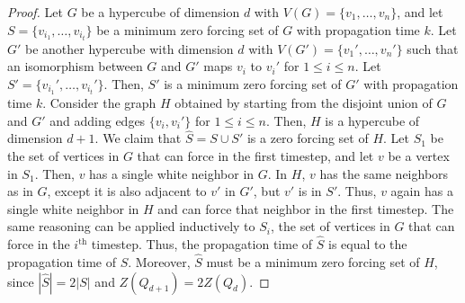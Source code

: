 \documentclass[twoside, 12pt]{article}
\theoremstyle{definition}
\begin{document}
\begin{proof}
Let $G$ be a hypercube of dimension $d$ with $V(G)=\{v_1,\ldots,v_n\}$, and let $S=\{v_{i_1},\ldots,v_{i_t}\}$ be a minimum zero forcing set of $G$ with propagation time $k$. Let $G'$ be another hypercube with dimension $d$ with $V(G')=\{v_1',\ldots,v_n'\}$ such that an isomorphism between $G$ and $G'$ maps $v_i$ to $v_i'$ for $1\leq i\leq n$. Let $S'=\{v_{i_1}',\ldots,v_{i_t}'\}$. Then, $S'$ is a minimum zero forcing set of $G'$ with propagation time $k$. Consider the graph $H$ obtained by starting from the disjoint union of $G$ and $G'$ and adding edges $\{v_i,v_i'\}$ for $1\leq i\leq n$. Then, $H$ is a hypercube of dimension $d+1$. We claim that $\hat{S}=S\cup S'$ is a zero forcing set of $H$. Let $S_1$ be the set of vertices in $G$ that can force in the first timestep, and let $v$ be a vertex in $S_1$. Then, $v$ has a single white neighbor in $G$. In $H$, $v$ has the same neighbors as in $G$, except it is also adjacent to $v'$ in $G'$, but $v'$ is in $S'$. Thus, $v$ again has a single white neighbor in $H$ and can force that neighbor in the first timestep. The same reasoning can be applied inductively to $S_i$, the set of vertices in $G$ that can force in the $i^{\text{th}}$ timestep. Thus, the propagation time of $\hat{S}$ is equal to the propagation time of $S$. Moreover, $\hat{S}$ must be a minimum zero forcing set of $H$, since $|\hat{S}|=2|S|$ and $Z(Q_{d+1})=2Z(Q_d)$. 
\end{proof}
\end{document}

